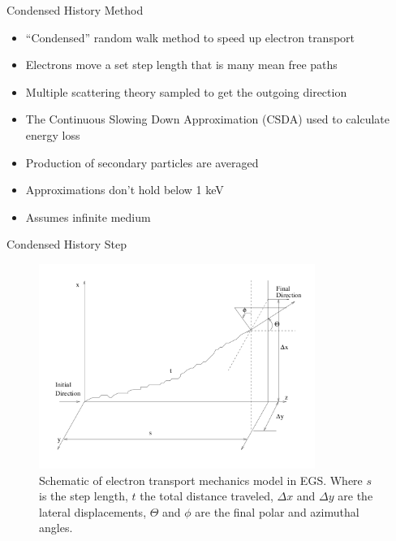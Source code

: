 \documentclass{beamer}
\begin{document}
\begin{frame}{Condensed History Method}

  \begin{itemize}
    \item ``Condensed'' random walk method to speed up electron transport
    \item Electrons move a set step length that is many mean free paths 
    \item Multiple scattering theory sampled to get the outgoing direction
    \item The Continuous Slowing Down Approximation (CSDA) used to calculate energy loss
    \item Production of secondary particles are averaged
    \item Approximations don't hold below 1 keV
    \item Assumes infinite medium 
  \end{itemize}

\end{frame}

\begin{frame}{Condensed History Step}
  
\begin{figure}
  \centering
  \includegraphics[width=90mm]{electron_step.png}
  \caption{Schematic of electron transport mechanics model in EGS. Where $s$ is the step length, $t$ the total distance traveled, $\Delta x$ and $\Delta y$ are the lateral displacements, $\Theta$ and $\phi$ are the final polar and azimuthal angles.}
\end{figure}


\end{frame}
\end{document}
